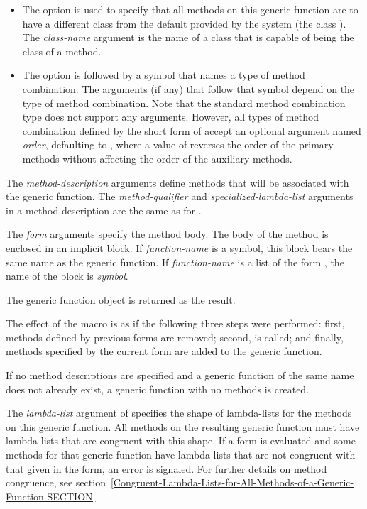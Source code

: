 \begin{defmac}
\begin{itemize}
\item  
The  option is used to specify that all methods on
this generic function are to have a different class from the default
provided by the system (the class ).  The {\it
class-name\/} argument is the name of a class that is capable of being
the class of a method.

\item  
The  option is followed by a symbol that
names a type of method combination.  The arguments (if any) that
follow that symbol depend on the type of method combination.  Note
that the standard method combination type does not support any
arguments.  However, all types of method combination defined by the
short form of  accept an optional
argument named \emph{order\/}, defaulting to 
, where a value of  reverses
the order of the primary methods without affecting the order of the
auxiliary methods.

\end{itemize}

The \emph{method-description\/} arguments define methods that will
be associated with the generic function.  The \emph{method-qualifier}
and \emph{specialized-lambda-list} arguments in a method description
are the same as for .

The \emph{form\/} arguments specify the method body.  The body of the
method is enclosed in an implicit block.  If {\it
function-name\/} is a symbol, this block bears the same name as
the generic function.  If \emph{function-name\/} is a list of the
form , the name of the block is {\it
symbol}.  


The generic function object is returned as the result. 


The effect of the  macro is as if the following three
steps were performed: first, methods defined by previous 
 forms are removed; second, 
is called; and finally, methods specified by the current 
 form are added to the generic function. 

If no method descriptions are specified and a generic function of the same
name does not already exist, a generic function with no methods is created.


The \emph{lambda-list\/} argument of 
 specifies the shape of lambda-lists for the methods on
this generic function.  All methods on the resulting generic function must have
lambda-lists that are congruent with this shape.  If a 
 form is evaluated and some methods for that generic
function have lambda-lists that are not congruent with that given in
the  form, an error is signaled.  For further details
on method congruence,
see section~\ref{Congruent-Lambda-Lists-for-All-Methods-of-a-Generic-Function-SECTION}.


\end{defmac}
